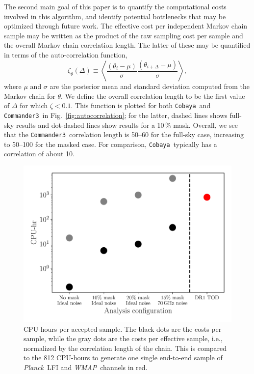 \documentclass[twocolumn]{../common/aa}
\def\wmap{\emph{WMAP}}
\def\planck{\emph{Planck}}
\def\commanderthree{\texttt{Commander3}}
\def\cobaya{\texttt{Cobaya}}
\begin{document}
The second main goal of this paper is to quantify the computational costs involved in this algorithm, and identify potential bottlenecks that may be optimized through future work. The effective cost per independent Markov chain sample may be written as the product of the raw sampling cost per sample and the overall Markov chain correlation length. The latter of these may be quantified in terms of the auto-correlation function,
\begin{equation}
  \zeta_\theta(\Delta) \equiv \left<\frac{(\theta_i - \mu)}{\sigma}\frac{(\theta_{i+\Delta} - \mu)}{\sigma}\right>,
\end{equation}
where $\mu$ and $\sigma$ are the posterior mean and standard deviation computed from the Markov chain for $\theta$. We define the overall correlation length to be the first value of $\Delta$ for which $\zeta < 0.1$. This function is plotted for both \cobaya\ and \commanderthree\ in Fig.~\ref{fig:autocorrelation}; for the latter, dashed lines shows full-sky results and dot-dashed lines show results for a 10\,\% mask. Overall, we see that the \commanderthree\ correlation length is 50--60 for the full-sky case, increasing to 50--100 for the masked case. For comparison, \cobaya\ typically has a correlation of about 10.

\begin{figure}
	\centering
	\includegraphics[width=\linewidth]{figures/run_time.pdf}
	\caption{\label{fig:runtime}CPU-hours per accepted sample. The black dots are the costs per sample, while the gray dots are the costs per effective sample, i.e., normalized by the correlation length of the chain. This is compared to the 812 CPU-hours to generate one single end-to-end sample of \planck\ LFI and \wmap\ channels in red.}
\end{figure}
\end{document}
